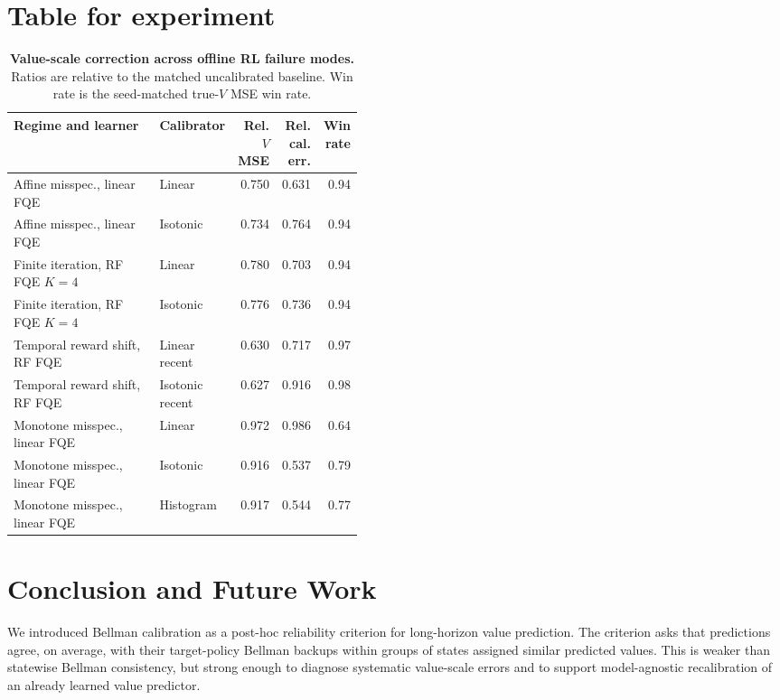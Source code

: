 \documentclass{article}
\theoremstyle{plain}
\theoremstyle{definition}
\theoremstyle{remark}
\begin{document}
 

 




 
\appendix

\section{Table for experiment}
\label{app:tablemain}
\begin{table}[h]
\centering
\caption{\textbf{Value-scale correction across offline RL failure modes.}
Ratios are relative to the matched uncalibrated baseline. Win rate is the
seed-matched true-\(V\) MSE win rate.}
\label{tab:main-simulation-results}
\scriptsize
\setlength{\tabcolsep}{4pt}
\begin{tabular}{@{}p{0.45\linewidth}lrrr@{}}
\toprule
Regime and learner & Calibrator & Rel. \(V\) MSE & Rel. cal. err. & Win rate \\
\midrule
Affine misspec., linear FQE & Linear & 0.750 & 0.631 & 0.94 \\
Affine misspec., linear FQE & Isotonic & 0.734 & 0.764 & 0.94 \\
Finite iteration, RF FQE \(K=4\) & Linear & 0.780 & 0.703 & 0.94 \\
Finite iteration, RF FQE \(K=4\) & Isotonic & 0.776 & 0.736 & 0.94 \\
Temporal reward shift, RF FQE & Linear recent & 0.630 & 0.717 & 0.97 \\
Temporal reward shift, RF FQE & Isotonic recent & 0.627 & 0.916 & 0.98 \\
Monotone misspec., linear FQE & Linear & 0.972 & 0.986 & 0.64 \\
Monotone misspec., linear FQE & Isotonic & 0.916 & 0.537 & 0.79 \\
Monotone misspec., linear FQE & Histogram & 0.917 & 0.544 & 0.77 \\
\bottomrule
\end{tabular}
\end{table}


\section{Conclusion and Future Work}
\label{app:concl}
We introduced Bellman calibration as a post-hoc reliability criterion for
long-horizon value prediction. The criterion asks that predictions agree, on
average, with their target-policy Bellman backups within groups of states
assigned similar predicted values. This is weaker than statewise Bellman
consistency, but strong enough to diagnose systematic value-scale errors and to
support model-agnostic recalibration of an already learned value predictor.
\end{document}
